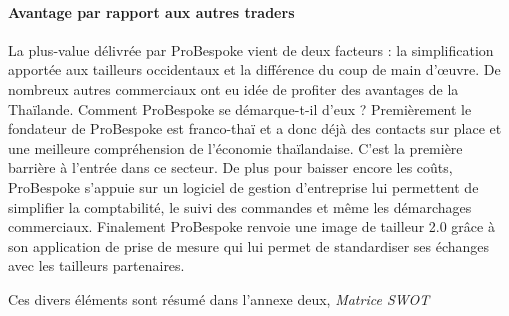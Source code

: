 \paragraph{Avantage par rapport aux autres traders}
La plus-value délivrée par ProBespoke vient de deux facteurs : la simplification apportée aux tailleurs occidentaux et la différence du coup de main d'œuvre.
De nombreux autres commerciaux ont eu idée de profiter des avantages de la Thaïlande. Comment ProBespoke se démarque-t-il d’eux ? Premièrement le fondateur de ProBespoke est franco-thaï et a donc déjà des contacts sur place et une meilleure compréhension de l'économie thaïlandaise. C'est la première barrière à l'entrée dans ce secteur. De plus pour baisser encore les coûts, ProBespoke s'appuie sur un logiciel de gestion d'entreprise lui permettent de simplifier la comptabilité, le suivi des commandes et même les démarchages commerciaux. Finalement ProBespoke renvoie une image de tailleur 2.0 grâce à son application de prise de mesure qui lui permet de standardiser ses échanges avec les tailleurs partenaires.

Ces divers éléments sont résumé dans l'annexe deux, \textit{Matrice SWOT}
